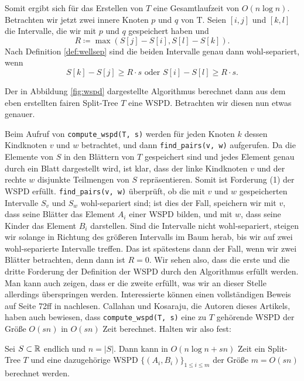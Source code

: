 Somit ergibt sich für das Erstellen von $T$ eine Gesamtlaufzeit von $O(n\log n)$.
Betrachten wir jetzt zwei innere Knoten $p$ und $q$ von T. Seien $[i, j]$ und $[k, l]$ die Intervalle, die wir mit $p$ und $q$ gespeichert haben und 
\[
R \coloneqq \max(S[j] - S[i], S[l] - S[k]).
\]
Nach Definition \ref{def:wellsep} sind die beiden Intervalle genau dann wohl-separiert, wenn 
\[
S[k] - S[j] \geq R \cdot s \text{ oder } S[i] - S[l] \geq R \cdot s.
\]



Der in Abbildung \ref{fig:wspd} dargestellte Algorithmus berechnet dann aus dem eben erstellten fairen Split-Tree $T$ eine WSPD.
Betrachten wir diesen nun etwas genauer.
 
Beim Aufruf von \texttt{compute\_wspd(T, s)} werden für jeden Knoten $k$ dessen Kindknoten $v$ und $w$ betrachtet, und dann \texttt{find\_pairs(v, w)} aufgerufen. 
Da die Elemente von $S$ in den Blättern von $T$ gespeichert sind und jedes Element genau durch ein Blatt dargestellt wird, ist klar, dass der linke Kindknoten $v$ und der rechte $w$ disjunkte Teilmengen von $S$ repräsentieren. 
Somit ist Forderung (1) der WSPD erfüllt. \texttt{find\_pairs(v, w)} überprüft, ob die mit $v$ und $w$ gespeicherten Intervalle $S_v$ und $S_w$ wohl-separiert sind; ist dies der Fall, speichern wir mit $v$, dass seine Blätter das Element $A_i$ einer WSPD bilden, und mit $w$, dass seine Kinder das Element $B_i$ darstellen. 
Sind die Intervalle nicht wohl-separiert, steigen wir solange in Richtung des größeren Intervalls im Baum herab, bis wir auf zwei wohl-separierte Intervalle treffen. 
Das ist spätestens dann der Fall, wenn wir zwei Blätter betrachten, denn dann ist $R = 0$.
Wir sehen also, dass die erste und die dritte Forderung der Definition der WSPD durch den Algorithmus erfüllt werden. 
Man kann auch zeigen, dass er die zweite erfüllt, was wir an dieser Stelle allerdings überspringen werden. 
Interessierte können einen vollständigen Beweis auf Seite 72ff in \cite{callahan} nachlesen. Callahan und Kosaraju, die Autoren dieses Artikels, haben auch bewiesen, dass \texttt{compute\_wspd(T, s)} eine zu $T$ gehörende WSPD der Größe $O(sn)$ in $O(sn)$ Zeit berechnet. 
Halten wir also fest:
\begin{theorem}
	\label{theo:wspdtime}
	Sei $S \subset \mathbb{R}$ endlich und $n = |S|$. Dann kann in $O(n \log n + sn)$ Zeit ein Split-Tree $T$ und eine dazugehörige WSPD $\{(A_i, B_i)\}_{1 \leq i \leq m}$ der Größe $m = O(sn)$ berechnet werden.
\end{theorem}